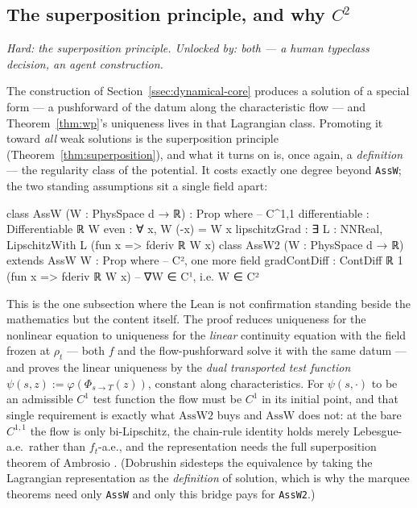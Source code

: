 \documentclass[11pt]{article}
\theoremstyle{plain}
\theoremstyle{definition}
\theoremstyle{remark}
\newcommand{\lean}[1]{\texttt{#1}}
\begin{document}
\subsection{The superposition principle, and why $C^2$}\label{ssec:superposition}

\noindent\emph{Hard: the superposition principle. Unlocked by: both --- a human typeclass decision, an agent construction.}

The construction of Section~\ref{ssec:dynamical-core} produces a solution of a
special form --- a pushforward of the datum along the characteristic flow --- and
Theorem~\ref{thm:wp}'s uniqueness lives in that Lagrangian class. Promoting it
toward \emph{all} weak solutions is the superposition principle
(Theorem~\ref{thm:superposition}), and what it turns on is, once
again, a \emph{definition} --- the regularity class of the potential. It costs
exactly one degree beyond \lean{AssW}; the two standing assumptions sit a single
field apart:
\begin{leancode}
class AssW (W : PhysSpace d → ℝ) : Prop where            -- C^{1,1}
  differentiable : Differentiable ℝ W
  even          : ∀ x, W (-x) = W x
  lipschitzGrad : ∃ L : NNReal, LipschitzWith L (fun x => fderiv ℝ W x)
class AssW2 (W : PhysSpace d → ℝ) extends AssW W : Prop where   -- C², one more field
  gradContDiff : ContDiff ℝ 1 (fun x => fderiv ℝ W x)   -- ∇W ∈ C¹, i.e. W ∈ C²
\end{leancode}

This is the one subsection where the Lean is not confirmation standing beside the
mathematics but the content itself. The proof reduces uniqueness for the nonlinear
equation to uniqueness for the \emph{linear} continuity equation with the field
frozen at $\rho_t$ --- both $f$ and the flow-pushforward solve it with the same
datum --- and proves the linear uniqueness by the \emph{dual transported test
function} $\psi(s,z):=\varphi(\Phi_{s\to T}(z))$, constant along characteristics.
For $\psi(s,\cdot)$ to be an admissible $C^1$ test function the flow must be $C^1$
in its initial point, and that single requirement is exactly what $\mathrm{AssW2}$
buys and $\mathrm{AssW}$ does not: at the bare $C^{1,1}$ the flow is only
bi-Lipschitz, the chain-rule identity holds merely Lebesgue-a.e.\ rather than
$f_t$-a.e., and the representation needs the full superposition theorem of Ambrosio
\cite{AGS}. (Dobrushin sidesteps the equivalence by taking the Lagrangian
representation as the \emph{definition} of solution, which is why the marquee
theorems need only \lean{AssW} and only this bridge pays for \lean{AssW2}.)
\end{document}
